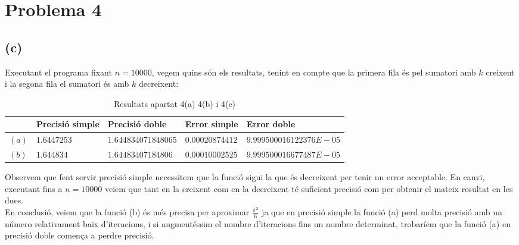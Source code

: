 \documentclass[a4paper,10pt]{article}
\begin{document}
\section*{Problema 4}
  \subsection*{(c)}
  Executant el programa fixant $n = 10000$, vegem quins són els resultats, tenint en compte que la primera fila és pel sumatori amb $k$ creixent i la segona fila el sumatori és amb $k$ decreixent:
  \begin{table}[H]
    \begin{center}
      \begin{tabular}[c]{|p{5mm}|p{27mm}|p{30 mm}|p{30 mm}|p{40 mm}|}
      \hline 
      & Precisió simple & Precisió doble & Error simple & Error doble\\
      \hline 
      $(a)$
      &
      $1.6447253$
      &
      $1.644834071848065$
      &
      $0.00020874412$
      &
      $9.999500016122376E-05$\\
      \hline
      $(b)$
      &
      $1.644834$
      &
      $1.64483407184806$
      &
      $0.00010002525$
      &
      $9.999500016677487E-05$\\
      \hline
      \end{tabular}
    \caption{Resultats apartat 4(a) 4(b) i 4(c)}
    \end{center}
  \end{table}
  Observem que fent servir precisió simple necessitem que la funció sigui la que és decreixent per tenir un error acceptable. En canvi, executant fins a $n=10000$ veiem que tant en la creixent com en la decreixent té suficient precisió com per obtenir el mateix resultat en les dues.\\
  En conclusió, veiem que la funció (b) és més precisa per aproximar $\frac{\pi^2}{6}$ ja que en precisió simple la funció (a) perd molta precisió amb un número relativament baix d'iteracions, i si augmentéssim el nombre d'iteracions fins un nombre determinat, trobaríem que la funció (a) en precisió doble comença a perdre precisió.
\end{document}
